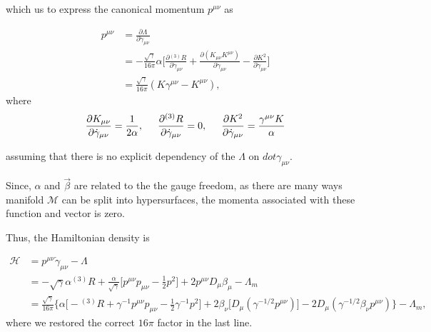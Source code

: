 \documentclass[11pt,a4paper,headinclude=true,DIV=14,BCOR=8mm,chapterprefix,listof=totoc,twoside,openright,abstracton]{scrbook}
\begin{document}
which us to express the canonical momentum $p^{\mu\nu}$ as

\begin{align}
    p^{\mu\nu} &= \frac{\partial\Lambda}{\partial\dot{\gamma}_{\mu\nu}} \\
    &= -\frac{\sqrt{\gamma}}{16\pi}\alpha\Bigg[\frac{\partial {^{(3)}R}}{\partial\dot{\gamma}_{\mu\nu}} + \frac{\partial(K_{\mu\nu}K^{\mu\nu})}{\partial\dot{\gamma}_{\mu\nu}} - \frac{\partial K^2}{\partial\dot{\gamma}_{\mu\nu}}\Bigg] \\
    &= \frac{\sqrt{\gamma}}{16\pi}(K\gamma^{\mu\nu} - K^{\mu\nu}),
\end{align}
where 
\begin{equation}
    \frac{\partial K_{\mu\nu}}{\partial \dot{\gamma}_{\mu\nu}} = \frac{1}{2\alpha}, \hspace{5mm} \frac{\partial {^{(3)}R}}{\partial \dot{\gamma}_{\mu\nu}} = 0, \hspace{5mm}\frac{\partial K^2}{\partial \dot{\gamma}_{\mu\nu}} = \frac{\gamma^{\mu\nu}K}{\alpha}
\end{equation}

assuming that there is no explicit dependency of the $\Lambda$ on $dot{\gamma}_{\mu\nu}$.

Since, $\alpha$ and $\vec{\beta}$ are related to the the gauge freedom, as there are many ways manifold $\mathcal{M}$ can be split into hypersurfaces, the momenta associated with these function and vector is zero. 

Thus, the Hamiltonian density is

\begin{align}
    \mathcal{H} &= p^{\mu\nu}\dot{\gamma}_{\mu\nu} - \Lambda \\
    &= -\sqrt{\gamma}\alpha{^{(3)}R} + \frac{\alpha}{\sqrt{\gamma}}\Big[p^{\mu\nu}p_{\mu\nu}-\frac{1}{2}p^2\Big] + 2p^{\mu\nu} D_{\mu}\beta_{\mu} -\Lambda_m \\
    &= \frac{\sqrt{\gamma}}{16\pi}\Bigg\{\alpha\Big[ -{^{(3)}R} + \gamma^{-1}p^{\mu\nu}p_{\mu\nu}-\frac{1}{2}\gamma^{-1}p^2\Big] +  2\beta_{\nu}\Big[D_{\mu}(\gamma^{-1/2}p^{\mu\nu})\Big] - 2D_{\mu}(\gamma^{-1/2}\beta_{\nu}p^{\mu\nu}) \Bigg\} - \Lambda_m,
\end{align}
where we restored the correct $16\pi$ factor in the last line.
\end{document}
